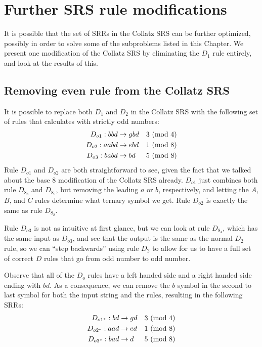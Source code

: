 \section{Further SRS rule modifications}\label{subsec:srsrulemod}
It is possible that the set of SRRs in the Collatz SRS can be further optimized, possibly in order to solve some of the subproblems listed in this Chapter. We present one modification of the Collatz SRS by eliminating the $D_1$ rule entirely, and look at the results of this.
\subsection{Removing even rule from the Collatz SRS}\label{subsubsec:evenruleremove}
It is possible to replace both $D_1$ and $D_2$ in the Collatz SRS with the following set of rules that calculates with strictly odd numbers:
\begin{align*}
    D_{o1}: bbd &\rightarrow gbd &\text{$3\ (\mathrm{mod}\ 4)$}\\
    D_{o2}: aabd &\rightarrow ebd &\text{$1\ (\mathrm{mod}\ 8)$}\\
    D_{o3}: babd &\rightarrow bd &\text{$5\ (\mathrm{mod}\ 8)$}
\end{align*}
Rule $D_{o1}$ and $D_{o2}$ are both straightforward to see, given the fact that we talked about the base 8 modification of the Collatz SRS already. $D_{o1}$ just combines both rule $D_{8_3}$ and $D_{8_5}$, but removing the leading $a$ or $b$, respectively, and letting the $A$, $B$, and $C$ rules determine what ternary symbol we get. Rule $D_{o2}$ is exactly the same as rule $D_{8_2}$.\par
Rule $D_{o3}$ is not as intuitive at first glance, but we can look at rule $D_{8_4}$, which has the same input as $D_{o3}$, and see that the output is the same as the normal $D_2$ rule, so we can ``step backwards'' using rule $D_2$ to allow for us to have a full set of correct $D$ rules that go from odd number to odd number.\par
Observe that all of the $D_o$ rules have a left handed side and a right handed side ending with $bd$. As a consequence, we can remove the $b$ symbol in the second to last symbol for both the input string and the rules, resulting in the following SRRs:
\begin{align*}
    D_{o1^*}: bd &\rightarrow gd &\text{$3\ (\mathrm{mod}\ 4)$}\\
    D_{o2^*}: aad &\rightarrow ed &\text{$1\ (\mathrm{mod}\ 8)$}\\
    D_{o3^*}: bad &\rightarrow d &\text{$5\ (\mathrm{mod}\ 8)$}
\end{align*}
